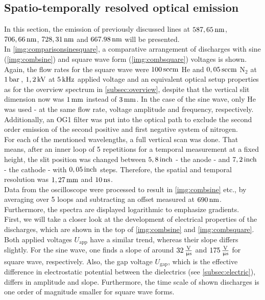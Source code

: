 \documentclass[a4paper,10pt,twoside]{article}
\newcommand{\ix}[1]{_\text{#1}}
\begin{document}
		\subsection{Spatio-temporally resolved optical emission}\label{subsec:stroe}
		
			In this section, the emission of previously discussed lines at $\unit[587,65]{nm}$, $\unit[706,66]{nm}$, $\unit[728,31]{nm}$ and $\unit[667.98]{nm}$ will be presented.\\
			In \autoref{img:comparisonsinesquare}, a comparative arrangement of discharges with sine (\autoref{img:combsine}) and square wave form (\autoref{img:combsquare}) voltages is shown. Again, the flow rates for the square wave were $\unit[100]{sccm}$ He and $\unit[0,05]{sccm}$ N$_2$ at $\unit[1]{bar}$\,, $\unit[1,2]{kV}$ at $\unit[5]{kHz}$ applied voltage and an equivalent optical setup properties as for the overview spectrum in \autoref{subsec:overview}, despite that the vertical slit dimension now was $\unit[1]{mm}$ instead of $\unit[3]{mm}$. In the case of the sine wave,	only He was used - at the same flow rate, voltage amplitude and frequency, respectively. Additionally, an OG1 filter was put into the optical path to exclude the second order emission of the second positive and first negative system of nitrogen.\\
			For each of the mentioned wavelengths, a full vertical scan was done. That means, after an inner loop of 5 repetitions for a temporal measurement at a fixed height, the slit position was changed between $\unit[5,8]{inch}$ - the anode - and $\unit[7,2]{inch}$ - the cathode - with $\unit[0,05]{inch}$ steps. Therefore, the spatial and temporal resolution was $\unit[1,27]{mm}$ and $\unit[10]{ns}$.\\
			Data from the oscilloscope were processed to result in \autoref{img:combsine} etc., by averaging over 5 loops and subtracting an offset measured at $\unit[690]{nm}$. Furthermore, the spectra are displayed logarithmic to emphasize gradients.\\
			First, we will take a closer look at the development of electrical properties of the discharges, which are shown in the top of \autoref{img:combsine} and \autoref{img:combsquare}. Both applied voltages $U\ix{app}$ have a similar trend, whereas their slope differs slightly. For the sine wave, one finds a slope of around $\unit[32]{\frac{V}{\upmu s}}$ and $\unit[175]{\frac{V}{\upmu s}}$ for square wave, respectively. Also, the gap voltage $U\ix{gap}$, which is the effective difference in electrostatic potential between the dielectrics (see \autoref{subsec:electric}), differs in amplitude and slope. Furthermore, the time scale of shown discharges is one order of magnitude smaller for square wave forms.\\
\end{document}
